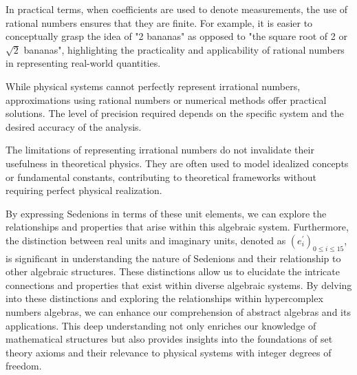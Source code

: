 \documentclass{article}
\begin{document}
In practical terms, when coefficients are used to denote measurements, the use of rational numbers ensures that they are finite. For example, it is easier to conceptually grasp the idea of "2 bananas" as opposed to "the square root of 2 or $\sqrt{2}$ bananas", highlighting the practicality and applicability of rational numbers in representing real-world quantities.

While physical systems cannot perfectly represent irrational numbers, approximations using rational numbers or numerical methods offer practical solutions. The level of precision required depends on the specific system and the desired accuracy of the analysis.

The limitations of representing irrational numbers do not invalidate their usefulness in theoretical physics. They are often used to model idealized concepts or fundamental constants, contributing to theoretical frameworks without requiring perfect physical realization.



By expressing Sedenions in terms of these unit elements, we can explore the relationships and properties that arise within this algebraic system. Furthermore, the distinction between real units and imaginary units, denoted as $(e^{'}_{i})_{0 \leq i \leq 15}$, is significant in understanding the nature of Sedenions and their relationship to other algebraic structures. These distinctions allow us to elucidate the intricate connections and properties that exist within diverse algebraic systems. By delving into these distinctions and exploring the relationships within hypercomplex numbers algebras, we can enhance our comprehension of abstract algebras and its applications. This deep understanding not only enriches our knowledge of mathematical structures but also provides insights into the foundations of set theory axioms and their relevance to physical systems with integer degrees of freedom.
\end{document}
